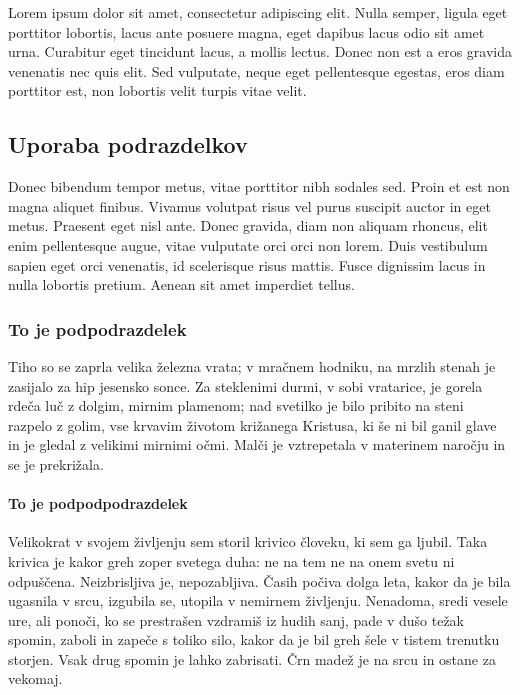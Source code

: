 \documentclass[a4paper]{article}
\begin{document}
Lorem ipsum dolor sit amet, consectetur adipiscing elit. Nulla semper, ligula eget
porttitor lobortis, lacus ante posuere magna, eget dapibus lacus odio sit amet urna.
Curabitur eget tincidunt lacus, a mollis lectus. Donec non est a eros gravida venenatis
nec quis elit. Sed vulputate, neque eget pellentesque egestas, eros diam porttitor est,
non lobortis velit turpis vitae velit.

\subsection{Uporaba podrazdelkov}

Donec bibendum tempor metus, vitae porttitor nibh sodales sed. Proin et est non magna
aliquet finibus. Vivamus volutpat risus vel purus suscipit auctor in eget metus. Praesent
eget nisl ante. Donec gravida, diam non aliquam rhoncus, elit enim pellentesque augue,
vitae vulputate orci orci non lorem. Duis vestibulum sapien eget orci venenatis, id
scelerisque risus mattis. Fusce dignissim lacus in nulla lobortis pretium. Aenean sit amet
imperdiet tellus.

\subsubsection{To je podpodrazdelek}

Tiho so se zaprla velika železna vrata; v mračnem hodniku, na mrzlih stenah je zasijalo za
hip jesensko sonce. Za steklenimi durmi, v sobi vratarice, je gorela rdeča luč z dolgim,
mirnim plamenom; nad svetilko je bilo pribito na steni razpelo z golim, vse krvavim
životom križanega Kristusa, ki še ni bil ganil glave in je gledal z velikimi mirnimi očmi.
Malči je vztrepetala v materinem naročju in se je prekrižala.

\paragraph{To je podpodpodrazdelek}

Velikokrat v svojem življenju sem storil krivico človeku, ki sem ga ljubil. Taka krivica
je kakor greh zoper svetega duha: ne na tem ne na onem svetu ni odpuščena. Neizbrisljiva
je, nepozabljiva. Časih počiva dolga leta, kakor da je bila ugasnila v srcu, izgubila se,
utopila v nemirnem življenju. Nenadoma, sredi vesele ure, ali ponoči, ko se prestrašen
vzdramiš iz hudih sanj, pade v dušo težak spomin, zaboli in zapeče s toliko silo, kakor da
je bil greh šele v tistem trenutku storjen. Vsak drug spomin je lahko zabrisati. Črn madež
je na srcu in ostane za vekomaj.
\end{document}
